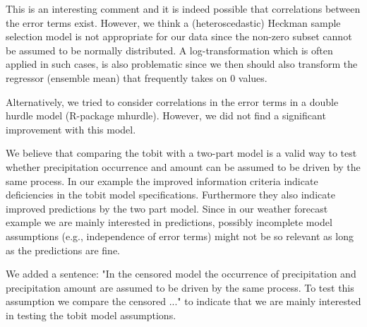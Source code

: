 \documentclass[12pt,a4paper]{article}
\begin{document}
This is an interesting comment and it is indeed possible that correlations
between the error terms exist.  However, we think a (heteroscedastic) Heckman
sample selection model is not appropriate for our data since the non-zero
subset cannot be assumed to be normally distributed. A log-transformation which
is often applied in such cases, is also problematic since we then should also
transform the regressor (ensemble mean) that frequently takes on 0 values.

Alternatively, we tried to consider correlations in the error terms in a double
hurdle model (R-package mhurdle).  However, we did not find a significant
improvement with this model. 

We believe that comparing the tobit with a two-part model is a valid way to
test whether precipitation occurrence and amount can be assumed to be driven by
the same process. In our example the improved information criteria indicate
deficiencies in the tobit model specifications. Furthermore they also indicate
improved predictions by the two part model. Since in our weather forecast
example we are mainly interested in predictions, possibly incomplete model
assumptions (e.g., independence of error terms) might not be so relevant as
long as the predictions are fine.

We added a sentence: "In the censored model the occurrence of precipitation and
precipitation amount are assumed to be driven by the same process. To test this
assumption we compare the censored ..." to indicate that we are mainly
interested in testing the tobit model assumptions.
\end{document}
